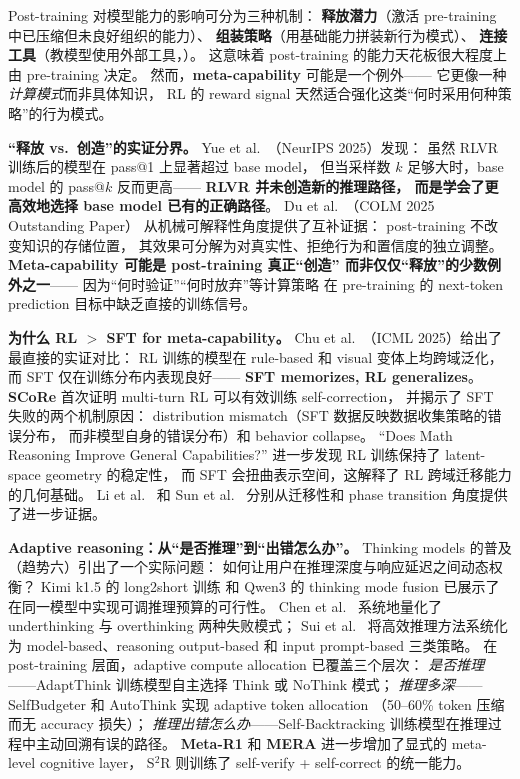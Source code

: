 Post-training 对模型能力的影响可分为三种机制：
\textbf{释放潜力}（激活 pre-training 中已压缩但未良好组织的能力）、
\textbf{组装策略}（用基础能力拼装新行为模式）、
\textbf{连接工具}（教模型使用外部工具，）。
这意味着 post-training 的能力天花板很大程度上由 pre-training 决定。
然而，\textbf{meta-capability} 可能是一个例外——
它更像一种\textit{计算模式}而非具体知识，
RL 的 reward signal 天然适合强化这类``何时采用何种策略''的行为模式。

\noindent
\textbf{``释放 vs.\ 创造''的实证分界。}
Yue et al.\ \cite{yue2025rlvr}（NeurIPS 2025）发现：
虽然 RLVR 训练后的模型在 pass@1 上显著超过 base model，
但当采样数 $k$ 足够大时，base model 的 pass@$k$ 反而更高——
\textbf{RLVR 并未创造新的推理路径，
而是学会了更高效地选择 base model 已有的正确路径}。
Du et al.\ \cite{du2025reshaping}（COLM 2025 Outstanding Paper）
从机械可解释性角度提供了互补证据：
post-training 不改变知识的存储位置，
其效果可分解为对真实性、拒绝行为和置信度的独立调整。
\textbf{Meta-capability 可能是 post-training 真正``创造''
而非仅仅``释放''的少数例外之一}——
因为``何时验证''``何时放弃''等计算策略
在 pre-training 的 next-token prediction 目标中缺乏直接的训练信号。

\noindent
\textbf{为什么 RL $>$ SFT for meta-capability。}
Chu et al.\ \cite{chu2025sftrl}（ICML 2025）给出了最直接的实证对比：
RL 训练的模型在 rule-based 和 visual 变体上均跨域泛化，
而 SFT 仅在训练分布内表现良好——
\textbf{SFT memorizes, RL generalizes}。
\textbf{SCoRe} \cite{kumar2024score}
首次证明 multi-turn RL 可以有效训练 self-correction，
并揭示了 SFT 失败的两个机制原因：
distribution mismatch（SFT 数据反映数据收集策略的错误分布，
而非模型自身的错误分布）和 behavior collapse。
``Does Math Reasoning Improve General Capabilities?'' \cite{mathreasoning2025}
进一步发现 RL 训练保持了 latent-space geometry 的稳定性，
而 SFT 会扭曲表示空间，这解释了 RL 跨域迁移能力的几何基础。
Li et al.\ \cite{transfer2025} 和 Sun et al.\ \cite{sun2025grokking}
分别从迁移性和 phase transition 角度提供了进一步证据。

\noindent
\textbf{Adaptive reasoning：从``是否推理''到``出错怎么办''。}
Thinking models 的普及（趋势六）引出了一个实际问题：
如何让用户在推理深度与响应延迟之间动态权衡？
Kimi k1.5 的 long2short 训练 \cite{moonshot2025kimi} 和
Qwen3 的 thinking mode fusion \cite{yang2025qwen3}
已展示了在同一模型中实现可调推理预算的可行性。
Chen et al.\ \cite{chen2025underthinking} 系统地量化了
underthinking 与 overthinking 两种失败模式；
Sui et al.\ \cite{sui2025stopoverthinking} 将高效推理方法系统化为
model-based、reasoning output-based 和 input prompt-based 三类策略。
在 post-training 层面，adaptive compute allocation 已覆盖三个层次：
\textit{是否推理}——AdaptThink \cite{zhang2025adaptthink} 训练模型自主选择 Think 或 NoThink 模式；
\textit{推理多深}——SelfBudgeter \cite{selfbudgeter2025}
和 AutoThink \cite{tu2025autothink} 实现 adaptive token allocation
（50--60\% token 压缩而无 accuracy 损失）；
\textit{推理出错怎么办}——Self-Backtracking \cite{selfbacktracking2025}
训练模型在推理过程中主动回溯有误的路径。
\textbf{Meta-R1} \cite{dong2025metar1} 和 \textbf{MERA} \cite{ha2025mera}
进一步增加了显式的 meta-level cognitive layer，
S$^2$R \cite{ma2025s2r} 则训练了 self-verify + self-correct 的统一能力。

